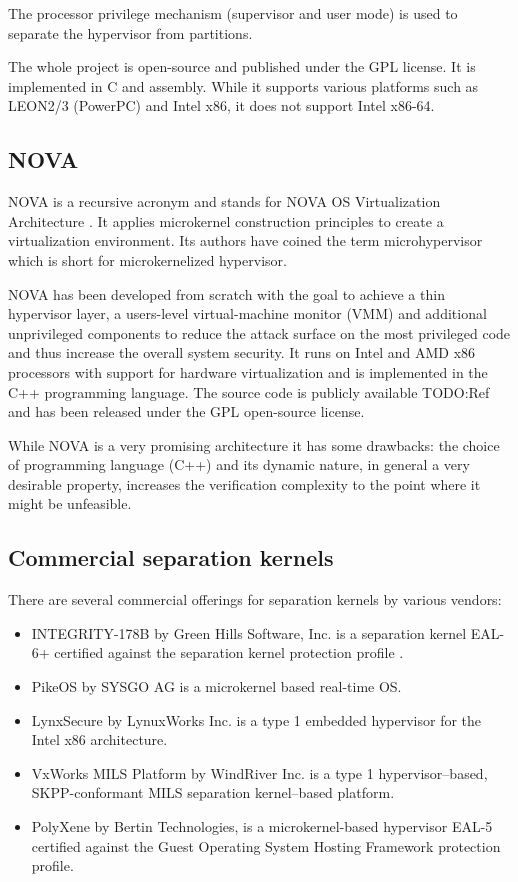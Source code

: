 The processor privilege mechanism (supervisor and user mode) is used to
separate the hypervisor from partitions.

The whole project is open-source and published under the GPL license. It is
implemented in C and assembly. While it supports various platforms such as
LEON2/3 (PowerPC) and Intel x86, it does not support Intel x86-64.

\subsection{NOVA}
NOVA is a recursive acronym and stands for NOVA OS Virtualization Architecture
\cite{Steinberg:2010:NMS:1755913.1755935}. It applies microkernel construction
principles to create a virtualization environment. Its authors have coined
the term microhypervisor which is short for
microkernelized hypervisor.

NOVA has been developed from scratch with the goal to achieve a thin hypervisor
layer, a users-level virtual-machine monitor (VMM) and additional unprivileged
components to reduce the attack surface on the most privileged code and thus
increase the overall system security. It runs on Intel and AMD x86 processors
with support for hardware virtualization and is implemented in the C++
programming language. The source code is publicly available TODO:Ref and has
been released under the GPL open-source license.

While NOVA is a very promising architecture it has some drawbacks: the choice of
programming language (C++) and its dynamic nature, in general a very desirable
property, increases the verification complexity to the point where it might be
unfeasible.

\subsection{Commercial separation kernels}\label{subsec:commercial-sks}
There are several commercial offerings for separation kernels by various
vendors:

\begin{itemize}
	\item INTEGRITY-178B by Green Hills Software, Inc. is a separation kernel
		EAL-6+ certified against the separation kernel protection profile
		\cite{SKPP}.
	\item PikeOS by SYSGO AG is a microkernel based real-time OS.
	\item LynxSecure by LynuxWorks Inc. is a type 1 embedded hypervisor for the
		Intel x86 architecture.
	\item VxWorks MILS Platform by WindRiver Inc. is a type 1 hypervisor–based,
		SKPP-conformant MILS separation kernel–based platform.
	\item PolyXene by Bertin Technologies, is a microkernel-based hypervisor
		EAL-5 certified against the Guest Operating System Hosting Framework
		protection profile.
\end{itemize}

